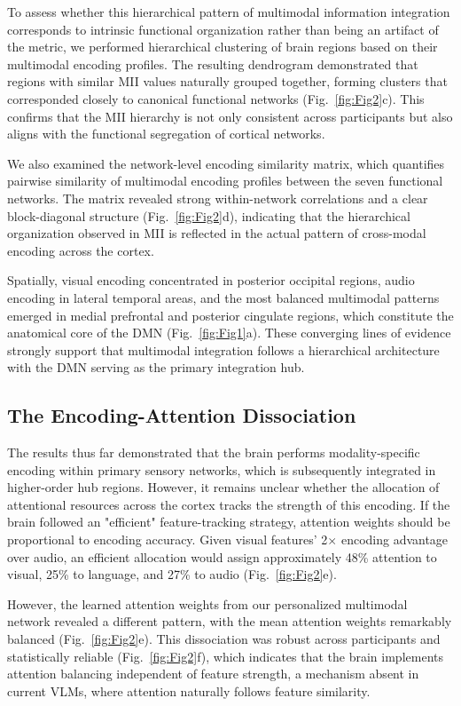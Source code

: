 \documentclass[10pt,letterpaper]{article}
\begin{document}
To assess whether this hierarchical pattern of multimodal information integration corresponds to intrinsic functional organization rather than being an artifact of the metric, we performed hierarchical clustering of brain regions based on their multimodal encoding profiles. The resulting dendrogram demonstrated that regions with similar MII values naturally grouped together, forming clusters that corresponded closely to canonical functional networks (Fig.~\ref{fig:Fig2}c). This confirms that the MII hierarchy is not only consistent across participants but also aligns with the functional segregation of cortical networks.

We also examined the network-level encoding similarity matrix, which quantifies pairwise similarity of multimodal encoding profiles between the seven functional networks. The matrix revealed strong within-network correlations and a clear block-diagonal structure (Fig.~\ref{fig:Fig2}d), indicating that the hierarchical organization observed in MII is reflected in the actual pattern of cross-modal encoding across the cortex.

Spatially, visual encoding concentrated in posterior occipital regions, audio encoding in lateral temporal areas, and the most balanced multimodal patterns emerged in medial prefrontal and posterior cingulate regions, which constitute the anatomical core of the DMN (Fig.~\ref{fig:Fig1}a). These converging lines of evidence strongly support that multimodal integration follows a hierarchical architecture with the DMN serving as the primary integration hub.

\subsection{The Encoding-Attention Dissociation}

The results thus far demonstrated that the brain performs modality-specific encoding within primary sensory networks, which is subsequently integrated in higher-order hub regions. However, it remains unclear whether the allocation of attentional resources across the cortex tracks the strength of this encoding. If the brain followed an "efficient" feature-tracking strategy, attention weights should be proportional to encoding accuracy. Given visual features' 2$\times$ encoding advantage over audio, an efficient allocation would assign approximately 48\% attention to visual, 25\% to language, and 27\% to audio (Fig.~\ref{fig:Fig2}e).

However, the learned attention weights from our personalized multimodal network revealed a different pattern, with the mean attention weights remarkably balanced (Fig.~\ref{fig:Fig2}e). This dissociation was robust across participants and statistically reliable (Fig.~\ref{fig:Fig2}f), which indicates that the brain implements attention balancing independent of feature strength, a mechanism absent in current VLMs, where attention naturally follows feature similarity.
\end{document}
